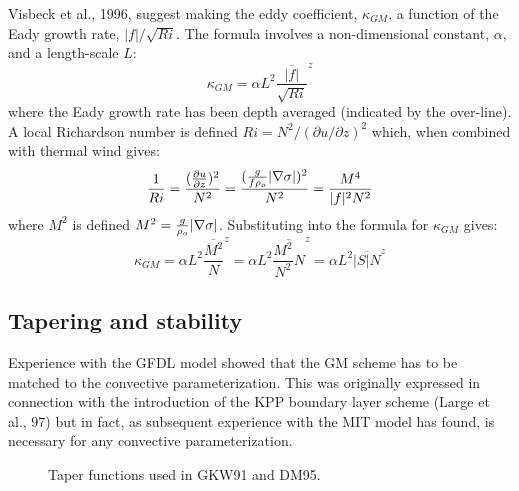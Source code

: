 Visbeck et al., 1996, suggest making the eddy coefficient,
$\kappa_{GM}$, a function of the Eady growth rate,
$|f|/\sqrt{Ri}$. The formula involves a non-dimensional constant,
$\alpha$, and a length-scale $L$:
\begin{displaymath}
\kappa_{GM} = \alpha L^2 \overline{ \frac{|f|}{\sqrt{Ri}} }^z
\end{displaymath}
where the Eady growth rate has been depth averaged (indicated by the
over-line). A local Richardson number is defined $Ri = N^2 / (\partial
u/\partial z)^2$ which, when combined with thermal wind gives:
\begin{displaymath}
\frac{1}{Ri} = \frac{(\frac{\partial u}{\partial z})^2}{N^2} =
\frac{ ( \frac{g}{f \rho_o} | {\bf \nabla} \sigma | )^2 }{N^2} =
\frac{ M^4 }{ |f|^2 N^2 }
\end{displaymath}
where $M^2$ is defined $M^2 = \frac{g}{\rho_o} |{\bf \nabla} \sigma|$.
Substituting into the formula for $\kappa_{GM}$ gives:
\begin{displaymath}
\kappa_{GM} = \alpha L^2 \overline{ \frac{M^2}{N} }^z =
\alpha L^2 \overline{ \frac{M^2}{N^2} N }^z =
\alpha L^2 \overline{ |S| N }^z
\end{displaymath}


\subsection{Tapering and stability}

Experience with the GFDL model showed that the GM scheme has to be
matched to the convective parameterization. This was originally
expressed in connection with the introduction of the KPP boundary
layer scheme (Large et al., 97) but in fact, as subsequent experience
with the MIT model has found, is necessary for any convective
parameterization.


\begin{figure}
\begin{center}
\end{center}
\caption{Taper functions used in GKW91 and DM95.}
\label{fig:tapers}
\end{figure}

